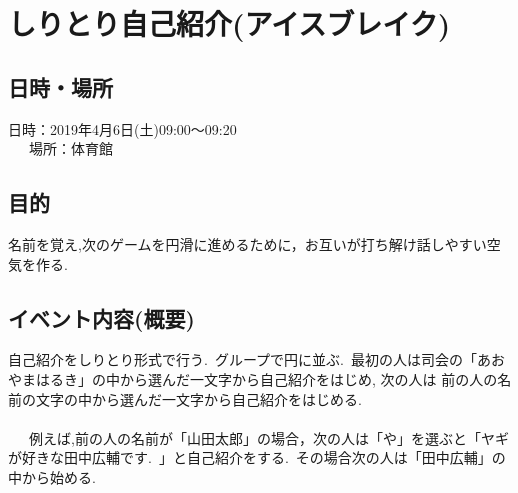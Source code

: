 \section{しりとり自己紹介(アイスブレイク)}
\subsection{日時・場所}
日時：2019年4月6日(土)09:00〜09:20\\
\ \ \ 場所：体育館\\

\subsection{目的}
名前を覚え,次のゲームを円滑に進めるために，お互いが打ち解け話しやすい空気を作る.

\subsection{イベント内容(概要)}
自己紹介をしりとり形式で行う.\ グループで円に並ぶ.\ 最初の人は司会の「あおやまはるき」の中から選んだ一文字から自己紹介をはじめ, 次の人は
前の人の名前の文字の中から選んだ一文字から自己紹介をはじめる. \\\\
\ \ \ 例えば,前の人の名前が「山田太郎」の場合，次の人は「や」を選ぶと「ヤギが好きな田中広輔です.\ 」と自己紹介をする.\ その場合次の人は「田中広輔」の中から始める.
